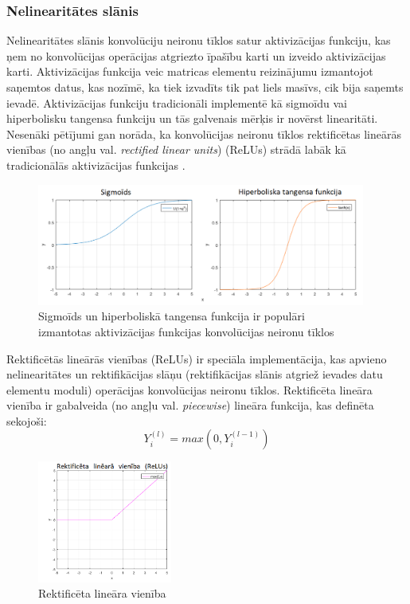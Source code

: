\subsubsection{Nelinearitātes slānis}
Nelinearitātes slānis konvolūciju neironu tīklos satur aktivizācijas funkciju, kas ņem no konvolūcijas operācijas atgriezto īpašību karti un izveido aktivizācijas karti. Aktivizācijas funkcija veic matricas elementu reizinājumu izmantojot saņemtos datus, kas nozīmē, ka tiek izvadīts tik pat liels masīvs, cik bija saņemts ievadē. Aktivizācijas funkciju tradicionāli implementē kā sigmoīdu vai hiperbolisku tangensa funkciju un tās galvenais mērķis ir novērst linearitāti. Nesenāki pētījumi gan norāda, ka konvolūcijas neironu tīklos rektificētas lineārās vienības (no angļu val. \textit{rectified linear units}) (ReLUs) strādā labāk kā tradicionālās aktivizācijas funkcijas \cite{nair2010rectified}. 
\begin{figure}[h]%
	\centering
	\includegraphics[height=4cm]{images/sigmoidhiperbol.png} %
	\caption{Sigmoīds un hiperboliskā tangensa funkcija ir populāri\\ izmantotas aktivizācijas funkcijas konvolūcijas neironu tīklos}%
	\label{fig:example}%
\end{figure}

Rektificētās lineārās vienības (ReLUs) ir speciāla implementācija, kas apvieno nelinearitātes un rektifikācijas slāņu (rektifikācijas slānis atgriež ievades datu elementu moduli) operācijas konvolūcijas neironu tīklos. Rektificēta lineāra vienība ir gabalveida (no angļu val. \textit{piecewise}) lineāra funkcija, kas definēta sekojoši:
\[ Y_i^{(l)} = max(0,Y_i^{(l-1)}) \]
\begin{figure}[h]%
	\centering
	\includegraphics[height=4cm]{images/relu.png} %
	\caption{Rektificēta lineāra vienība}%
	\label{fig:example}%
\end{figure}

